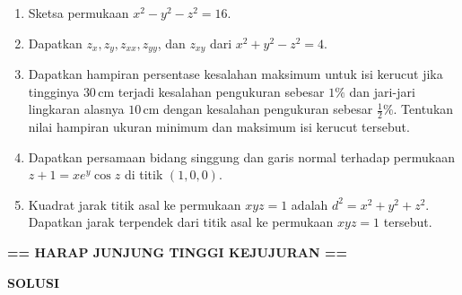 \documentclass[11pt,a4paper]{article}
\begin{document}
\begin{enumerate}
  \item Sketsa permukaan
        $
          x^2 - y^2 - z^2 = 16.
        $

  \item Dapatkan $z_x, z_y, z_{xx}, z_{yy}$, dan $z_{xy}$ dari
        $
          x^2 + y^2 - z^2 = 4.
        $

  \item Dapatkan hampiran persentase kesalahan maksimum untuk isi kerucut jika tingginya $30\,\text{cm}$ terjadi kesalahan pengukuran sebesar $1\%$ dan jari-jari lingkaran alasnya $10\,\text{cm}$ dengan kesalahan pengukuran sebesar $\tfrac{1}{2}\%$. Tentukan nilai hampiran ukuran minimum dan maksimum isi kerucut tersebut.

  \item Dapatkan persamaan bidang singgung dan garis normal terhadap permukaan
        $
          z + 1 = x e^{y} \cos z
        $
        di titik $(1, 0, 0)$.

  \item Kuadrat jarak titik asal ke permukaan $xyz = 1$ adalah
        $
          d^2 = x^2 + y^2 + z^2.
        $
        Dapatkan jarak terpendek dari titik asal ke permukaan $xyz = 1$ tersebut.
\end{enumerate}
\begin{center}
  \textbf{== HARAP JUNJUNG TINGGI KEJUJURAN ==}
\end{center}
\newpage
{}
\fancyfoot[C]{}
{\centering
  \textbf{SOLUSI}
  \par
}
\end{document}
